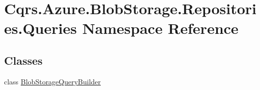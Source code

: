 \hypertarget{namespaceCqrs_1_1Azure_1_1BlobStorage_1_1Repositories_1_1Queries}{}\section{Cqrs.\+Azure.\+Blob\+Storage.\+Repositories.\+Queries Namespace Reference}
\label{namespaceCqrs_1_1Azure_1_1BlobStorage_1_1Repositories_1_1Queries}
\subsection*{Classes}
\begin{DoxyCompactItemize}
\item 
class \hyperlink{classCqrs_1_1Azure_1_1BlobStorage_1_1Repositories_1_1Queries_1_1BlobStorageQueryBuilder}{Blob\+Storage\+Query\+Builder}
\end{DoxyCompactItemize}
